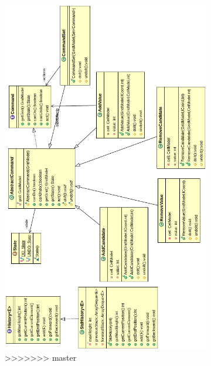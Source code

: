 \begin{figure}[ht]
\begin{figure}[ht]
  \includegraphics [width=140mm]{images/history.png} \\[0.5cm]
>>>>>>> master
\end{figure}


\end{figure}
